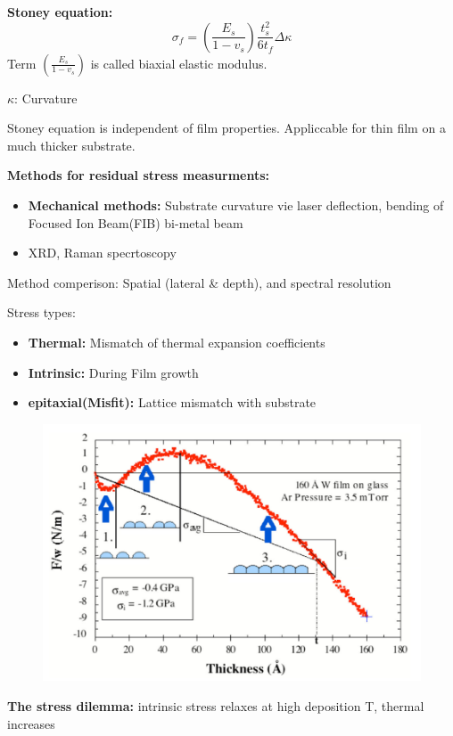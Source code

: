 \textbf{Stoney equation:}
\[
\sigma_f = \left(\frac{E_s}{1-v_s}\right)\frac{t^2_s}{6 t_f}\Delta \kappa
\]
Term \(\left(\frac{E_s}{1-v_s}\right)\) is called biaxial elastic modulus.

\(\kappa\): Curvature

Stoney equation is independent of film properties. Appliccable for thin film on a much thicker substrate.

\textbf{Methods for residual stress measurments:}
\begin{itemize}
    \item \textbf{Mechanical methods:} Substrate curvature vie laser deflection, bending of Focused Ion Beam(FIB) bi-metal beam
    \item XRD, Raman specrtoscopy 
\end{itemize}

Method comperison: Spatial (lateral \& depth), and spectral resolution

Stress types:
\begin{itemize}
    \item \textbf{Thermal:} Mismatch of thermal expansion coefficients
    \item \textbf{Intrinsic:} During Film growth
    \item \textbf{epitaxial(Misfit):} Lattice mismatch with substrate
\end{itemize}

\begin{figure}[h]
    \centering
    \includegraphics[width=\columnwidth]{images/insitu.png}
    \label{fig:insitu}
\end{figure}

\textbf{The stress dilemma:} intrinsic stress relaxes at high deposition T, thermal increases

